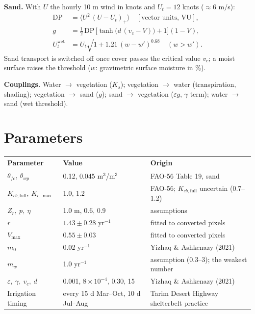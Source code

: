 \documentclass[11pt,a4paper]{article}
\begin{document}
\textbf{Sand.} With $U$ the hourly 10 m wind in knots and $U_t=12$ knots ($\approx 6$ m/s):
\begin{align}
\mathrm{DP}&=\bigl\langle U^2\,(U-U_t)_+\bigr\rangle\quad[\text{vector units, VU}],\\
g&=\tfrac12\,\mathrm{DP}\,\bigl[\tanh\bigl(d\,(v_c-V)\bigr)+1\bigr](1-V),\\
U_t^{\text{wet}}&=U_t\sqrt{1+1.21\,(w-w')^{0.68}}\quad(w>w').
\end{align}
Sand transport is switched off once cover passes the critical value $v_c$; a moist surface raises the threshold ($w$: gravimetric surface moisture in \%).

\textbf{Couplings.} Water $\to$ vegetation ($K_s$); vegetation $\to$ water (transpiration, shading); vegetation $\to$ sand ($g$); sand $\to$ vegetation ($\varepsilon g$, $\gamma$ term); water $\to$ sand (wet threshold).

\section{Parameters}
\begin{table}[H]\small
\begin{tabularx}{\linewidth}{@{}p{3.2cm}p{4.2cm}L@{}}
\toprule
Parameter & Value & Origin\\
\midrule
$\theta_{fc},\ \theta_{wp}$ & 0.12, 0.045 m$^3$/m$^3$ & FAO-56 Table 19, sand\\
$K_{cb,\mathrm{full}},\ K_{c,\max}$ & 1.0, 1.2 & FAO-56; $K_{cb,\mathrm{full}}$ uncertain (0.7--1.2)\\
$Z_r,\ p,\ \eta$ & 1.0 m, 0.6, 0.9 & assumptions\\
$r$ & $1.43\pm0.28$ yr$^{-1}$ & fitted to converted pixels\\
$V_{\max}$ & $0.55\pm0.03$ & fitted to converted pixels\\
$m_0$ & 0.02 yr$^{-1}$ & Yizhaq \& Ashkenazy (2021)\\
$m_w$ & 1.0 yr$^{-1}$ & assumption (0.3--3); the weakest number\\
$\varepsilon,\ \gamma,\ v_c,\ d$ & 0.001, $8\times10^{-4}$, 0.30, 15 & Yizhaq \& Ashkenazy (2021)\\
Irrigation timing & every 15 d Mar--Oct, 10 d Jul--Aug & Tarim Desert Highway shelterbelt practice\\
\bottomrule
\end{tabularx}
\end{table}
\end{document}
